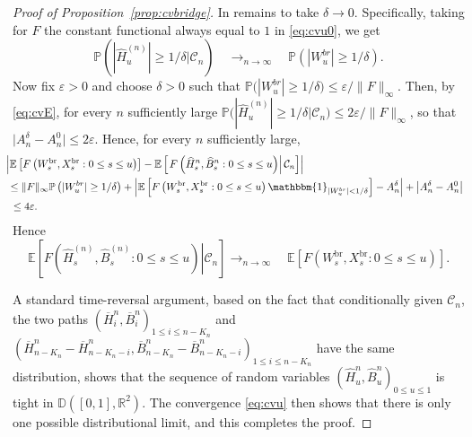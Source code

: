 \documentclass[AHL,XML,longabstracts,Unicode]{cedram}
\newcommand{\R}{\mathbb{R}}
\newcommand{\D}{\mathbb{D}}
\def\oB{\overline{B}}
\def\hB{\widehat{B}}
\def\oH{\overline{H}}
\def\hH{\widehat{H}}
\renewcommand{\epsilon}{\varepsilon}
\newcommand\Es[1]{\mathbb{E}\left[#1\right]}
\renewcommand\Pr[1]{\mathbb{P}\left(#1\right)}
\newcommand\Prb[1]{\mathbb{P}\big(#1\big)}
\begin{document}
\begin{proof}[Proof of Proposition~\ref{prop:cvbridge}]
In remains to take $\delta \rightarrow 0$. Specifically,
taking for $F$ the constant functional always equal to $1$ in \eqref{eq:cvu0}, we get
\begin{equation}
\label{eq:cvE}\Pr{ |\hH^{(n)}_{u}| \geq 1/\delta \big|  \mathcal{C}_{n} }  \quad \mathop{\longrightarrow}_{n \rightarrow \infty} \quad  \Pr{|W^{br}_{u}| \geq 1/\delta}.
\end{equation}
Now fix $\epsilon>0$ and choose $\delta>0$ such that $  \Prb{|W^{br}_{u}| \geq 1/\delta} \leq \epsilon/ \| F \|_{\infty}$. Then, by \eqref{eq:cvE},  for every $n$ sufficiently large  $\Prb{  |\hH^{(n)}_{u}| \geq  1/\delta \big| \mathcal{C}_{n}} \leq 2\epsilon / \| F \|_{\infty}$, so that $\big| A_{n}^{\delta} - A_{n}^{0} \big| \leq 2 \epsilon$. Hence, for every $n$ sufficiently large,
\begin{align*}
  & \hspace{-3mm} \left| \Es{F \left(   W^{\textrm{br}}_{s},X^{\textrm{br}}_{s} : 0 \leq s \leq u \right) }- \Es{ \left. F \left(  \hH^{n}_{s},\hB^{n}_{s} : 0 \leq s \leq u \right) \right| \mathcal{C}_{n}}  \right|\\
  & \hspace{-2mm} \leq \| F \|_{\infty} \Pr{|W^{br}_{u}| \geq 1/\delta} +
\left| \Es{F \left(   W^{\textrm{br}}_{s},X^{\textrm{br}}_{s} : 0 \leq s \leq u \right)\mathbbm{1}_{|W^{br}_{u}|<1/\delta}}  -A_{n}^{\delta}  \right| +  \left| A_{n}^{\delta} - A_{n}^{0} \right | \\
& \hspace{-1mm}\leq 4 \epsilon.
\end{align*}
Hence
\begin{equation}
\label{eq:cvu}\Es{ \left. F \left(  \hH^{(n)}_{s},  \hB^{(n)}_{s} : 0 \leq s \leq u \right) \right|  \mathcal{C}_{n} }   \mathop{\longrightarrow}_{n \rightarrow \infty} \quad \Es{F \left(  W^{\textrm{br}}_{s},X^{\textrm{br}}_{s} : 0 \leq s \leq u \right) }.
\end{equation}

A standard time-reversal argument, based on the fact that conditionally given $ \mathcal{C}_{n}$, the two paths  $(\oH^{n}_{i},\oB^{n}_{i})_{1 \leq i \leq n-K_{n}}$ and $(\oH^{n}_{n-K_{n}}-\oH^{n}_{n-K_{n}-i},\oB^{n}_{n-K_{n}}-\oB^{n}_{n-K_{n}-i})_{1 \leq i \leq n-K_{n}}$ have the same distribution, shows that the sequence of random variables $  (  \hH^{n}_{u}, \hB^{n}_{u} )_{0 \leq u \leq 1}$ is tight in $\D([0,1],\R^{2})$. The convergence \eqref{eq:cvu} then shows that there is only one possible distributional limit, and this completes the proof.
\end{proof}
\end{document}
